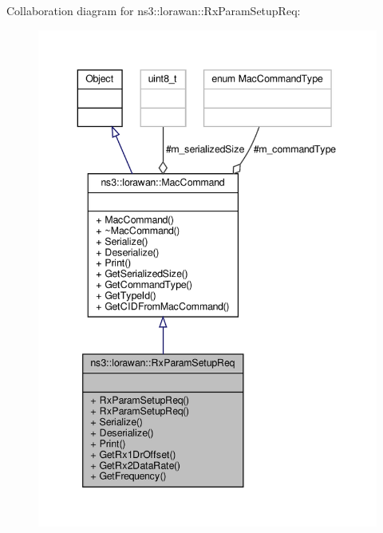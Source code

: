 Collaboration diagram for ns3\+:\+:lorawan\+:\+:Rx\+Param\+Setup\+Req\+:
\nopagebreak
\begin{figure}[H]
\begin{center}
\leavevmode
\includegraphics[width=343pt]{classns3_1_1lorawan_1_1RxParamSetupReq__coll__graph}
\end{center}
\end{figure}
